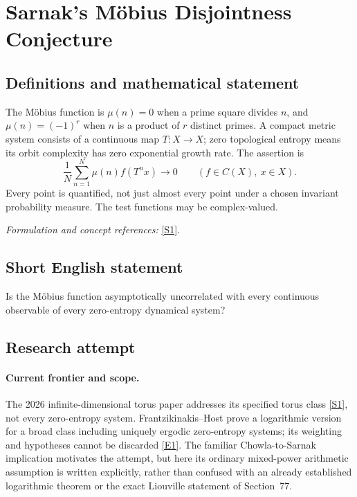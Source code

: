 \documentclass[11pt,a4paper]{article}
\numberwithin{equation}{section}
\newcommand{\sref}[2]{\hyperlink{source:#1:#2}{[S#2]}}
\newcommand{\eref}[2]{\hyperlink{extra:#1:#2}{[E#2]}}
\newif\ifshowcatalogue
\newcommand{\cataloguescope}[1]{\ifshowcatalogue
 \paragraph{Exact scope in the supplied catalogue.}
 \begin{quote}\small #1\end{quote}\fi}
\begin{document}
\setcounter{section}{0}
\section*{\texorpdfstring{Sarnak's Möbius Disjointness Conjecture}{Sarnak's Möbius Disjointness Conjecture}}\label{30002209}
\subsection{Definitions and mathematical statement}
The Möbius function is $\mu(n)=0$ when a prime square divides $n$, and $\mu(n)=(-1)^r$ when $n$ is a product of $r$ distinct primes. A compact metric system consists of a continuous map $T:X\to X$; zero topological entropy means its orbit complexity has zero exponential growth rate. The assertion is
\[
 \frac1N\sum_{n=1}^{N}\mu(n)f(T^nx)\longrightarrow0
 \qquad(f\in C(X),\ x\in X).
\]
Every point is quantified, not just almost every point under a chosen invariant probability measure. The test functions may be complex-valued.
\par\smallskip\textit{Formulation and concept references:} \sref{30002209}{1}.
\cataloguescope{Prove that for every compact metric topological dynamical system (X,T) of zero topological entropy, every continuous f on X, and every x in X, the average N\textasciicircum{}(-1) sum\_\{n<=N\} mu(n) f(T\textasciicircum{}n x) tends to zero as N tends to infinity.}
\subsection{Short English statement}
Is the Möbius function asymptotically uncorrelated with every continuous observable of every zero-entropy dynamical system?
\subsection{Research attempt}

\paragraph{Current frontier and scope.}
The 2026 infinite-dimensional torus paper addresses its specified torus
class \sref{30002209}{1}, not every zero-entropy system. Frantzikinakis--Host
prove a logarithmic version for a broad class including uniquely ergodic
zero-entropy systems; its weighting and hypotheses cannot be discarded
\eref{30002209}{1}. The familiar Chowla-to-Sarnak implication motivates the
attempt, but here its ordinary mixed-power arithmetic assumption is
written explicitly, rather than confused with an already established
logarithmic theorem or the exact Liouville statement of Section~77.
\end{document}
